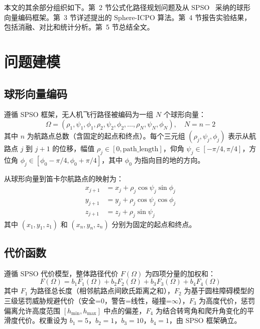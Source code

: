 \documentclass[11pt,a4paper]{ctexart}
\begin{document}
本文的其余部分组织如下。第~2 节公式化路径规划问题及从 SPSO~\cite{sps2021} 采纳的球形向量编码框架。第~3 节详述提出的 Sphere-ICPO 算法。第~4 节报告实验结果，包括消融、对比和统计分析。第~5 节总结全文。

\section{问题建模}

\subsection{球形向量编码}

遵循 SPSO 框架，无人机飞行路径被编码为一组 $N$ 个球形向量：
\begin{equation}
    \Omega = (\rho_1, \psi_1, \phi_1, \rho_2, \psi_2, \phi_2, \ldots, \rho_N, \psi_N, \phi_N), \quad N = n - 2
\end{equation}
其中 $n$ 为航路点总数（含固定的起点和终点）。每个三元组 $(\rho_j, \psi_j, \phi_j)$ 表示从航路点 $j$ 到 $j+1$ 的位移，幅值 $\rho_j \in [0, \text{path\_length}]$，仰角 $\psi_j \in [-\pi/4, \pi/4]$，方位角 $\phi_j \in [\phi_0 - \pi/4, \phi_0 + \pi/4]$，其中 $\phi_0$ 为指向目的地的方向。

从球形向量到笛卡尔航路点的映射为：
\begin{align}
    x_{j+1} &= x_j + \rho_j \cos\psi_j \sin\phi_j \label{eq:cartx} \\
    y_{j+1} &= y_j + \rho_j \cos\psi_j \cos\phi_j \label{eq:carty} \\
    z_{j+1} &= z_j + \rho_j \sin\psi_j \label{eq:cartz}
\end{align}
其中 $(x_1, y_1, z_1)$ 和 $(x_n, y_n, z_n)$ 分别为固定的起点和终点。

\subsection{代价函数}

遵循 SPSO 代价模型，整体路径代价 $F(\Omega)$ 为四项分量的加权和：
\begin{equation}
    F(\Omega) = b_1 F_1(\Omega) + b_2 F_2(\Omega) + b_3 F_3(\Omega) + b_4 F_4(\Omega)
\end{equation}
其中 $F_1$ 为路径总长度（相邻航路点间欧氏距离之和），$F_2$ 为基于圆柱障碍模型的三级惩罚威胁规避代价（安全=0，警告=线性，碰撞=$\infty$），$F_3$ 为高度代价，惩罚偏离允许高度范围 $[h_{\min}, h_{\max}]$ 中点的偏差，$F_4$ 为结合转弯角和爬升角变化的平滑度代价。权重设为 $b_1 = 5$，$b_2 = 1$，$b_3 = 10$，$b_4 = 1$，由 SPSO 框架确立。
\end{document}
